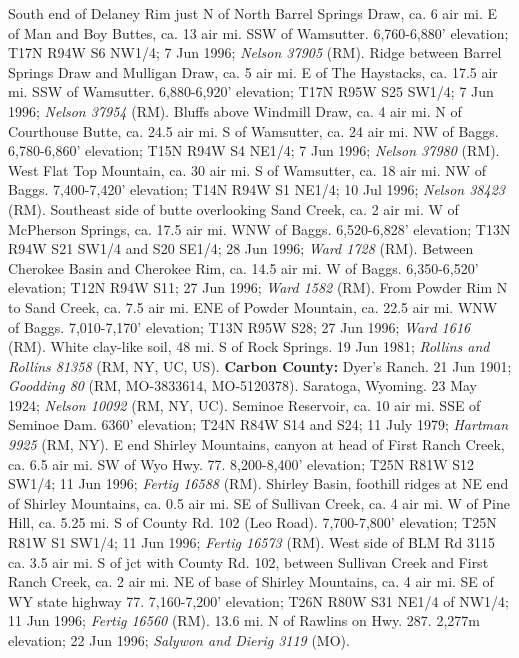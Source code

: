 South end of Delaney Rim just N of North Barrel Springs Draw, ca. 6 air mi. E of
Man and Boy Buttes, ca. 13 air mi. SSW of Wamsutter. 6,760-6,880' elevation;
T17N R94W S6 NW1/4; 7 Jun 1996; \textit{Nelson 37905} (RM).
Ridge between Barrel Springs Draw and Mulligan Draw, ca. 5 air mi. E of The
Haystacks, ca. 17.5 air mi. SSW of Wamsutter. 6,880-6,920' elevation;
T17N R95W S25 SW1/4; 7 Jun 1996; \textit{Nelson 37954} (RM).
Bluffs above Windmill Draw, ca. 4 air mi. N of Courthouse Butte, ca. 24.5 air
mi. S of Wamsutter, ca. 24 air mi. NW of Baggs. 6,780-6,860' elevation;
T15N R94W S4 NE1/4; 7 Jun 1996; \textit{Nelson 37980} (RM).
West Flat Top Mountain, ca. 30 air mi. S of Wamsutter, ca. 18 air mi. NW of
Baggs. 7,400-7,420' elevation; T14N R94W S1 NE1/4; 10 Jul 1996;
\textit{Nelson 38423} (RM).
Southeast side of butte overlooking Sand Creek, ca. 2 air mi. W of McPherson
Springs, ca. 17.5 air mi. WNW of Baggs. 6,520-6,828' elevation;
T13N R94W S21 SW1/4 and S20 SE1/4; 28 Jun 1996; \textit{Ward	1728} (RM).
Between Cherokee Basin and Cherokee Rim, ca. 14.5 air mi. W of Baggs.
6,350-6,520' elevation; T12N R94W S11; 27 Jun 1996; \textit{Ward 1582} (RM).
From Powder Rim N to Sand Creek, ca. 7.5 air mi. ENE of Powder Mountain, ca.
22.5 air mi. WNW of Baggs. 7,010-7,170' elevation; T13N R95W S28; 27 Jun 1996;
\textit{Ward 1616} (RM).
White clay-like soil, 48 mi. S of Rock Springs. 19 Jun 1981;
\textit{Rollins and Rollins 81358} (RM, NY, UC, US).
  \textbf{Carbon County:}
Dyer’s Ranch. 21 Jun 1901; \textit{Goodding 80} (RM, MO-3833614, MO-5120378).
Saratoga, Wyoming. 23 May 1924; \textit{Nelson 10092} (RM, NY, UC).
Seminoe Reservoir, ca. 10 air mi. SSE of Seminoe Dam. 6360’ elevation;
T24N R84W S14 and S24; 11 July 1979; \textit{Hartman 9925} (RM, NY).
E end Shirley Mountains, canyon at head of First Ranch Creek, ca. 6.5 air mi.
SW of Wyo Hwy. 77. 8,200-8,400’ elevation; T25N R81W S12 SW1/4; 11 Jun 1996;
\textit{Fertig 16588} (RM).
Shirley Basin, foothill ridges at NE end of Shirley Mountains, ca. 0.5 air mi.
SE of Sullivan Creek, ca. 4 air mi. W of Pine Hill, ca. 5.25 mi. S of County Rd.
102 (Leo Road). 7,700-7,800’ elevation; T25N R81W S1 SW1/4; 11 Jun 1996;
\textit{Fertig 16573} (RM).
West side of BLM Rd 3115 ca. 3.5 air mi. S of jct with County Rd. 102, between
Sullivan Creek and First Ranch Creek, ca. 2 air mi. NE of base of Shirley
Mountains, ca. 4 air mi. SE of WY state highway 77. 7,160-7,200’ elevation;
T26N R80W S31 NE1/4 of NW1/4; 11 Jun 1996; \textit{Fertig 16560} (RM).
13.6 mi. N of Rawlins on Hwy. 287. 2,277m elevation; 22 Jun 1996;
\textit{Salywon and Dierig 3119} (MO).
